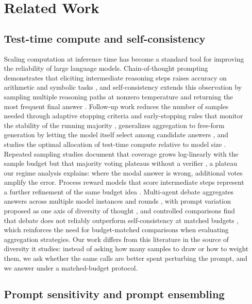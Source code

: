 \section{Related Work}
\label{sec:related}

\subsection{Test-time compute and self-consistency}

Scaling computation at inference time has become a standard tool for improving the reliability of large language models. Chain-of-thought prompting demonstrates that eliciting intermediate reasoning steps raises accuracy on arithmetic and symbolic tasks \citep{wei2022chain}, and self-consistency extends this observation by sampling multiple reasoning paths at nonzero temperature and returning the most frequent final answer \citep{wang2023selfconsistency}. Follow-up work reduces the number of samples needed through adaptive stopping criteria \citep{aggarwal2023lets} and early-stopping rules that monitor the stability of the running majority \citep{li2024escape}, generalizes aggregation to free-form generation by letting the model itself select among candidate answers \citep{chen2023universal}, and studies the optimal allocation of test-time compute relative to model size \citep{snell2024scaling}. Repeated sampling studies document that coverage grows log-linearly with the sample budget but that majority voting plateaus without a verifier \citep{brown2024large}, a plateau our regime analysis explains: where the modal answer is wrong, additional votes amplify the error. Process reward models that score intermediate steps represent a further refinement of the same budget idea \citep{lightman2023lets}. Multi-agent debate aggregates answers across multiple model instances and rounds \citep{du2023improving}, with prompt variation proposed as one axis of diversity of thought \citep{naik2023diversity}, and controlled comparisons find that debate does not reliably outperform self-consistency at matched budgets \citep{smit2024mad}, which reinforces the need for budget-matched comparisons when evaluating aggregation strategies. Our work differs from this literature in the source of diversity it studies: instead of asking how many samples to draw or how to weight them, we ask whether the same calls are better spent perturbing the prompt, and we answer under a matched-budget protocol.

\subsection{Prompt sensitivity and prompt ensembling}

